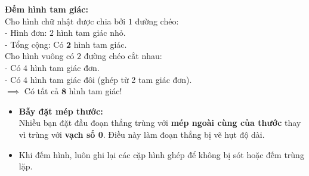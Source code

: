 \documentclass[11pt,a4paper]{article}
\begin{document}
\vspace{-1.5mm}
\noindent
\begin{minipage}[t]{0.49\textwidth}\vspace{0pt}
\begin{tcolorbox}[
  enhanced,
  colback=green!4!white,
  colframe=green!60!black,
  arc=2mm, boxrule=0.8pt,
  left=2mm, right=2mm, top=1.8mm, bottom=1.8mm,
  title={\footnotesize\bfseries\color{white}\faCheckCircle\ 4. Ví dụ thực hành chuẩn mực}
]
{\footnotesize
\textbf{Đếm hình tam giác:}\\
Cho hình chữ nhật được chia bởi $1$ đường chéo:\\
- Hình đơn: $2$ hình tam giác nhỏ.\\
- Tổng cộng: Có $\mathbf{2}$ hình tam giác.\\
Cho hình vuông có $2$ đường chéo cắt nhau:\\
- Có $4$ hình tam giác đơn.\\
- Có $4$ hình tam giác đôi (ghép từ 2 tam giác đơn).\\
$\implies$ Có tất cả $\mathbf{8}$ hình tam giác!
}
\end{tcolorbox}
\end{minipage}
\hfill
\begin{minipage}[t]{0.49\textwidth}\vspace{0pt}
\begin{tcolorbox}[
  enhanced,
  colback=red!4!white,
  colframe=red!75!black,
  arc=2mm, boxrule=0.8pt,
  left=2mm, right=2mm, top=1.8mm, bottom=1.8mm,
  title={\footnotesize\bfseries\color{white}\faExclamationTriangle\ 5. Mẹo tránh bẫy trắc nghiệm}
]
{\footnotesize
\begin{itemize}\setlength{\itemsep}{1pt}\setlength{\leftskip}{-2.5mm}
  \item \textbf{Bẫy đặt mép thước:}\\
  Nhiều bạn đặt đầu đoạn thẳng trùng với \textbf{mép ngoài cùng của thước} thay vì trùng với \textbf{vạch số 0}. Điều này làm đoạn thẳng bị vẽ hụt độ dài.
  \item Khi đếm hình, luôn ghi lại các cặp hình ghép để không bị sót hoặc đếm trùng lặp.
\end{itemize}
}
\end{tcolorbox}
\end{minipage}
\end{document}
